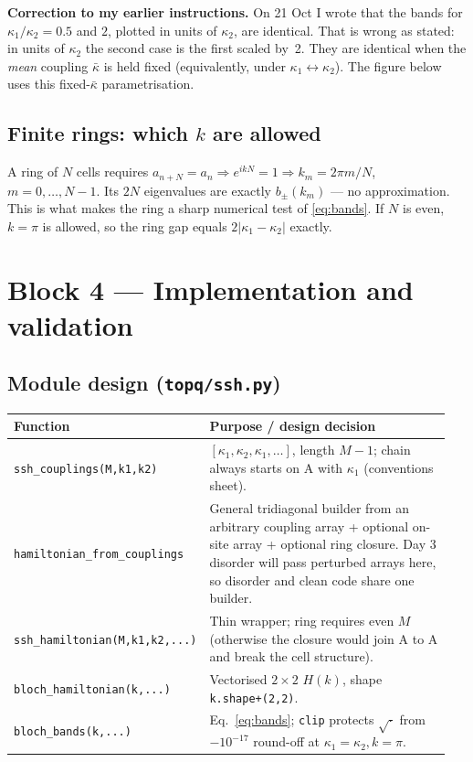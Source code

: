 \documentclass[10pt,a4paper]{article}
\newcommand{\kb}{\bar\kappa}
\newcommand{\ka}{\kappa_1}
\newcommand{\kc}{\kappa_2}
\newcommand{\note}[1]{\par\smallskip\noindent\colorbox{gray!12}{\parbox{\dimexpr\linewidth-2\fboxsep}{\small #1}}\par\smallskip}
\begin{document}
\note{\textbf{Correction to my earlier instructions.} On 21 Oct I wrote that the bands for $\ka/\kc=0.5$ and $2$, plotted in units of $\kc$, are identical. That is wrong as stated: in units of $\kc$ the second case is the first scaled by~2. They are identical when the \emph{mean} coupling $\kb$ is held fixed (equivalently, under $\ka\leftrightarrow\kc$). The figure below uses this fixed-$\kb$ parametrisation.}

\subsection{Finite rings: which $k$ are allowed}
A ring of $N$ cells requires $a_{n+N}=a_n\Rightarrow e^{ikN}=1\Rightarrow k_m=2\pi m/N$, $m=0,\dots,N-1$. Its $2N$ eigenvalues are exactly $b_\pm(k_m)$ --- no approximation. This is what makes the ring a sharp numerical test of \eqref{eq:bands}. If $N$ is even, $k=\pi$ is allowed, so the ring gap equals $2|\ka-\kc|$ exactly.

\section{Block 4 --- Implementation and validation}
\subsection{Module design (\texttt{topq/ssh.py})}
\begin{tabular}{@{}p{0.33\linewidth}p{0.62\linewidth}@{}}\toprule
Function & Purpose / design decision\\\midrule
\texttt{ssh\_couplings(M,k1,k2)} & $[\ka,\kc,\ka,\dots]$, length $M-1$; chain always starts on A with $\ka$ (conventions sheet).\\
\texttt{hamiltonian\_from\_couplings} & General tridiagonal builder from an arbitrary coupling array + optional on-site array + optional ring closure. Day 3 disorder will pass perturbed arrays here, so disorder and clean code share one builder.\\
\texttt{ssh\_hamiltonian(M,k1,k2,...)} & Thin wrapper; ring requires even $M$ (otherwise the closure would join A to A and break the cell structure).\\
\texttt{bloch\_hamiltonian(k,...)} & Vectorised $2\times2$ $H(k)$, shape \texttt{k.shape+(2,2)}.\\
\texttt{bloch\_bands(k,...)} & Eq.~\eqref{eq:bands}; \texttt{clip} protects $\sqrt{\cdot}$ from $-10^{-17}$ round-off at $\ka=\kc,k=\pi$.\\\bottomrule
\end{tabular}
\end{document}
